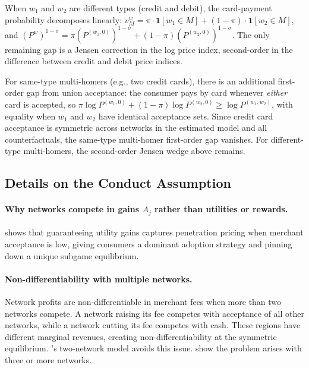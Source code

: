 \documentclass[main.tex]{subfiles}
\begin{document}
When $w_1$ and $w_2$ are different types (credit and debit), the card-payment probability decomposes linearly: $v^w_M = \pi \cdot \mathbf{1}[w_1 \in M] + (1-\pi) \cdot \mathbf{1}[w_2 \in M]$, and $(P^w)^{1-\sigma} = \pi (P^{(w_1,0)})^{1-\sigma} + (1-\pi) (P^{(w_2,0)})^{1-\sigma}$.
The only remaining gap is a Jensen correction in the log price index, second-order in the difference between credit and debit price indices.

For same-type multi-homers (e.g., two credit cards), there is an additional first-order gap from union acceptance: the consumer pays by card whenever \emph{either} card is accepted, so $\pi \log P^{(w_1,0)} + (1 - \pi) \log P^{(w_2,0)} \geq \log P^{(w_1, w_2)}$, with equality when $w_1$ and $w_2$ have identical acceptance sets.
Since credit card acceptance is symmetric across networks in the estimated model and all counterfactuals, the same-type multi-homer first-order gap vanishes. 
For different-type multi-homers, the second-order Jensen wedge above remains.

\subsection{Details on the Conduct Assumption}\label{subsec:oa-conduct}

\paragraph{Why networks compete in gains $A_j$ rather than utilities or rewards.}
\textcite{Weyl2010} shows that guaranteeing utility gains captures penetration pricing when merchant acceptance is low, giving consumers a dominant adoption strategy and pinning down a unique subgame equilibrium.

\paragraph{Non-differentiability with multiple networks.}
Network profits are non-differentiable in merchant fees when more than two networks compete.
A network raising its fee competes with acceptance of all other networks, while a network cutting its fee competes with cash.
These regions have different marginal revenues, creating non-differentiability at the symmetric equilibrium.
\textcite{Rochet.Tirole2003}'s two-network model avoids this issue. \textcite{Teh.etal2022} show the problem arises with three or more networks.
\end{document}

